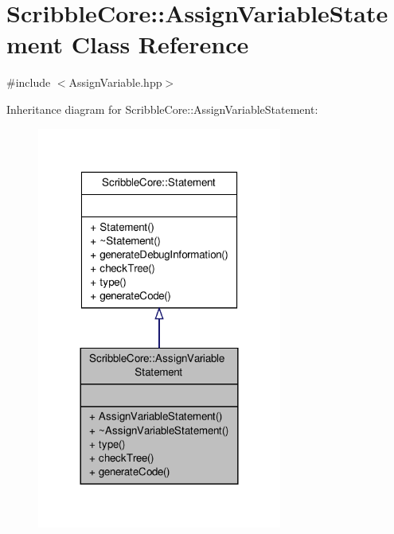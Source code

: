\hypertarget{class_scribble_core_1_1_assign_variable_statement}{\section{Scribble\-Core\-:\-:Assign\-Variable\-Statement Class Reference}
\label{class_scribble_core_1_1_assign_variable_statement}
}


{\ttfamily \#include $<$Assign\-Variable.\-hpp$>$}



Inheritance diagram for Scribble\-Core\-:\-:Assign\-Variable\-Statement\-:
\nopagebreak
\begin{figure}[H]
\begin{center}
\leavevmode
\includegraphics[width=228pt]{class_scribble_core_1_1_assign_variable_statement__inherit__graph}
\end{center}
\end{figure}


